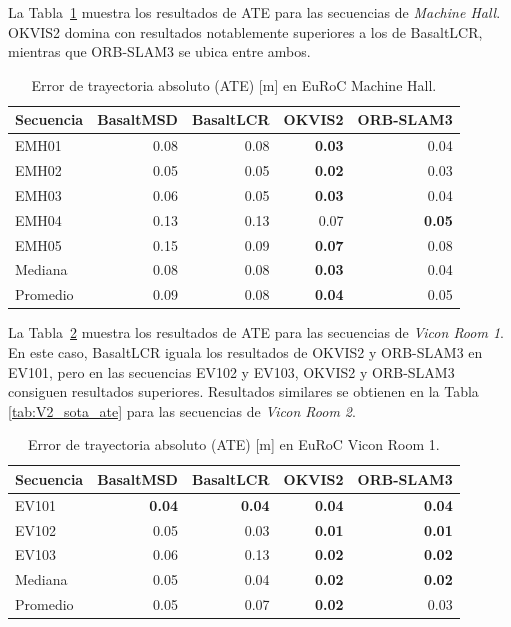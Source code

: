 La Tabla~\ref{tab:MH_sota_ate} muestra los resultados de ATE para las secuencias de \textit{Machine Hall}. OKVIS2 domina con resultados notablemente superiores a los de BasaltLCR, mientras que ORB-SLAM3 se ubica entre ambos.
%
\begin{table}[!htbp]
\centering
\caption{Error de trayectoria absoluto (ATE) [m] en EuRoC Machine Hall.}
\label{tab:MH_sota_ate}
\begin{tabular}{lrrrr}
\toprule
\textbf{Secuencia} & \textbf{BasaltMSD} & \textbf{BasaltLCR} & \textbf{OKVIS2} & \textbf{ORB-SLAM3} \\
\midrule
EMH01 & 0.08 & 0.08 & \textbf{0.03} & 0.04 \\
EMH02 & 0.05 & 0.05 & \textbf{0.02} & 0.03 \\
EMH03 & 0.06 & 0.05 & \textbf{0.03} & 0.04 \\
EMH04 & 0.13 & 0.13 & 0.07 & \textbf{0.05} \\
EMH05 & 0.15 & 0.09 & \textbf{0.07} & 0.08 \\
\midrule
Mediana & 0.08 & 0.08 & \textbf{0.03} & 0.04 \\
Promedio & 0.09 & 0.08 & \textbf{0.04} & 0.05 \\
\bottomrule
\end{tabular}
\end{table}

La Tabla~\ref{tab:V1_sota_ate} muestra los resultados de ATE para las secuencias de \textit{Vicon Room 1}. En este caso, BasaltLCR iguala los resultados de OKVIS2 y ORB-SLAM3 en EV101, pero en las secuencias EV102 y EV103, OKVIS2 y ORB-SLAM3 consiguen resultados superiores. Resultados similares se obtienen en la Tabla \ref{tab:V2_sota_ate} para las secuencias de \textit{Vicon Room 2}.
%
\begin{table}[!htbp]
\centering
\caption{Error de trayectoria absoluto (ATE) [m] en EuRoC Vicon Room 1.}
\label{tab:V1_sota_ate}
\begin{tabular}{lrrrr}
\toprule
\textbf{Secuencia} & \textbf{BasaltMSD} & \textbf{BasaltLCR} & \textbf{OKVIS2} & \textbf{ORB-SLAM3} \\
\midrule
EV101 & \textbf{0.04} & \textbf{0.04} & \textbf{0.04} & \textbf{0.04} \\
EV102 & 0.05 & 0.03 & \textbf{0.01} & \textbf{0.01} \\
EV103 & 0.06 & 0.13 & \textbf{0.02} & \textbf{0.02} \\
\midrule
Mediana & 0.05 & 0.04 & \textbf{0.02} & \textbf{0.02} \\
Promedio & 0.05 & 0.07 & \textbf{0.02} & 0.03 \\
\bottomrule
\end{tabular}
\end{table}

